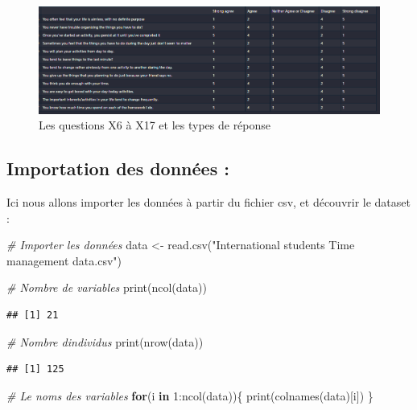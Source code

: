 \documentclass[
]{article}
\newenvironment{Shaded}{\begin{snugshade}}{\end{snugshade}}
\newcommand{\CommentTok}[1]{\textcolor[rgb]{0.56,0.35,0.01}{\textit{#1}}}
\newcommand{\ControlFlowTok}[1]{\textcolor[rgb]{0.13,0.29,0.53}{\textbf{#1}}}
\newcommand{\DecValTok}[1]{\textcolor[rgb]{0.00,0.00,0.81}{#1}}
\newcommand{\FunctionTok}[1]{\textcolor[rgb]{0.00,0.00,0.00}{#1}}
\newcommand{\NormalTok}[1]{#1}
\newcommand{\OtherTok}[1]{\textcolor[rgb]{0.56,0.35,0.01}{#1}}
\newcommand{\SpecialCharTok}[1]{\textcolor[rgb]{0.00,0.00,0.00}{#1}}
\newcommand{\StringTok}[1]{\textcolor[rgb]{0.31,0.60,0.02}{#1}}
\begin{document}
\begin{figure}
\centering
\includegraphics{q.png}
\caption{Les questions X6 à X17 et les types de réponse}
\end{figure}

\hypertarget{importation-des-donnuxe9es}{%
\subsection{Importation des données
:}\label{importation-des-donnuxe9es}}

Ici nous allons importer les données à partir du fichier csv, et
découvrir le dataset :

\begin{Shaded}
\begin{Highlighting}[]
\CommentTok{\# Importer les données}
\NormalTok{data }\OtherTok{\textless{}{-}} \FunctionTok{read.csv}\NormalTok{(}\StringTok{"International students Time management data.csv"}\NormalTok{)}

\CommentTok{\# Nombre de variables}
\FunctionTok{print}\NormalTok{(}\FunctionTok{ncol}\NormalTok{(data))}
\end{Highlighting}
\end{Shaded}

\begin{verbatim}
## [1] 21
\end{verbatim}

\begin{Shaded}
\begin{Highlighting}[]
\CommentTok{\# Nombre d\textquotesingle{}individus}
\FunctionTok{print}\NormalTok{(}\FunctionTok{nrow}\NormalTok{(data))}
\end{Highlighting}
\end{Shaded}

\begin{verbatim}
## [1] 125
\end{verbatim}

\begin{Shaded}
\begin{Highlighting}[]
\CommentTok{\# Le noms des variables}
\ControlFlowTok{for}\NormalTok{(i }\ControlFlowTok{in} \DecValTok{1}\SpecialCharTok{:}\FunctionTok{ncol}\NormalTok{(data))\{}
  \FunctionTok{print}\NormalTok{(}\FunctionTok{colnames}\NormalTok{(data)[i])}
\NormalTok{\}}
\end{Highlighting}
\end{Shaded}
\end{document}
